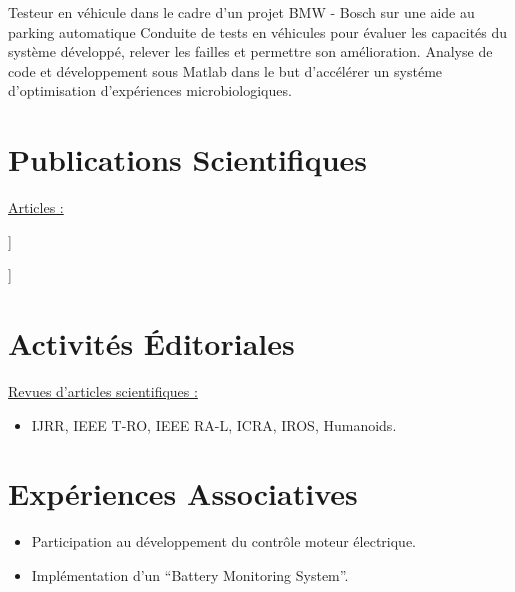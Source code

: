 \documentclass[11pt,a4paper,sans]{moderncv}         %
\newcommand{\items}{\item \hspace{2mm}}
\begin{document}
%
{Testeur en v\'ehicule dans le cadre d'un projet BMW - Bosch sur une aide au parking automatique}{
  Conduite de tests en v\'ehicules pour \'evaluer les capacit\'es du syst\`eme d\'evelopp\'e, relever les failles et permettre son am\'elioration.
}
%
{Analyse de code et d\'eveloppement sous Matlab dans le but d'acc\'el\'erer un syst\'eme d'optimisation d'exp\'eriences microbiologiques.
}

\section{Publications Scientifiques}

\toggletrue{myrefs}

\large{\underline{Articles :}}

\begin{itemize}%
\normalsize{\item[[1]\hspace{-2mm}]} \normalsize{}
\normalsize{\item[[2]\hspace{-2mm}]} \normalsize{}
\end{itemize}

\newsavebox\mytempbib
\savebox\mytempbib{\parbox{\textwidth}{}}


\section{Activit\'es  \'Editoriales}
\large{\underline{Revues d'articles scientifiques :}}
\begin{itemize}%
\items IJRR, IEEE T-RO, IEEE RA-L, ICRA, IROS, Humanoids.
\end{itemize}

\section{Exp\'eriences Associatives}
{
  \begin{itemize}
    \item Participation au d\'eveloppement du contr\^ole moteur \'electrique.
    \item Impl\'ementation d'un ``Battery Monitoring System''.
  \end{itemize}
}
\end{document}
